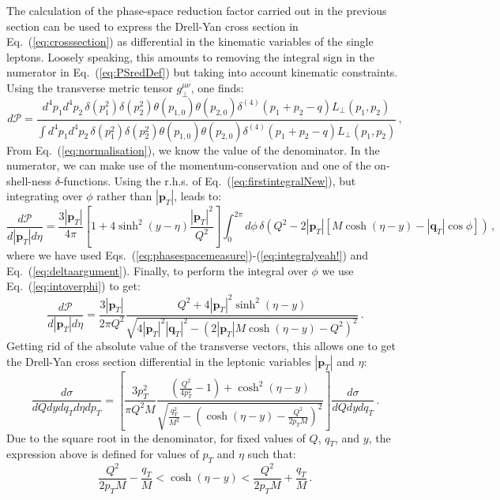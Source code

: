 \documentclass[10pt,a4paper]{article}
\begin{document}
The calculation of the phase-space reduction factor carried out in the
previous section can be used to express the Drell-Yan cross section in
Eq.~(\ref{eq:crosssection}) as differential in the kinematic variables
of the single leptons. Loosely speaking, this amounts to removing the
integral sign in the numerator in Eq.~(\ref{eq:PSredDef}) but taking
into account kinematic constraints. Using the transverse metric tensor
$g_\perp^{\mu\nu}$, one finds:
\begin{equation}
d\mathcal{P} = \frac{\displaystyle d^4p_1 d^4p_2 \,\delta(p_1^2) \delta(p_2^2)\theta(p_{1,0}) \theta(p_{2,0})\delta^{(4)}(p_1+p_2-q) L_\perp(p_1,p_2)}{\displaystyle \int d^4p_1 d^4p_2\, \delta(p_1^2) \delta(p_2^2) \theta(p_{1,0}) \theta(p_{2,0})\delta^{(4)}(p_1+p_2-q) L_\perp(p_1,p_2)}\,,
\end{equation}
From Eq.~(\ref{eq:normalisation}), we know the value of the
denominator. In the numerator, we can make use of the
momentum-conservation and one of the on-shell-ness
$\delta$-functions. Using the r.h.s. of
Eq.~(\ref{eq:firstintegralNew}), but integrating over $\phi$ rather
than $|\mathbf{p}_T|$, leads to:
\begin{equation}
\frac{d\mathcal{P}}{d|\mathbf{p}_T|d\eta} = \frac {3 |\mathbf{p}_T|}{4\pi}\left[1+4 \sinh^2(y-\eta)\frac{|\mathbf{p}_T|^2}{Q^2}\right]
 \int_0^{2\pi} d\phi\,\delta(Q^2-2 |\mathbf{p}_T|\left[M\cosh\left(\eta - y\right)-|\mathbf{q}_T|\cos\phi\right])\,,
\end{equation}
where we have used
Eqs.~(\ref{eq:phasespacemeasure})-(\ref{eq:integralyeah!}) and
Eq.~(\ref{eq:deltaargument}). Finally, to perform the integral over
$\phi$ we use Eq.~(\ref{eq:intoverphi}) to get:
\begin{equation}\label{eq:difflepphasespace}
\frac{d\mathcal{P}}{d|\mathbf{p}_T|d\eta} = \frac {3|\mathbf{p}_T|}{2\pi Q^2}
 \frac{Q^2+4 |\mathbf{p}_T|^2 \sinh^2(\eta-y)}{\sqrt{4|\mathbf{p}_T|^2|\mathbf{q}_T|^2-(2|\mathbf{p}_T|M\cosh(\eta-y)-Q^2)^2}}\,.
\end{equation}
Getting rid of the absolute value of the transverse vectors, this
allows one to get the Drell-Yan cross section differential in the
leptonic variables $|\mathbf{p}_T|$ and $\eta$:
\begin{equation}
\frac{d\sigma}{dQ dy dq_T d\eta dp_T} =
                                                          \left[\frac
                                                          {3p_T^2}{\pi
                                                          Q^2 M}\frac{\left(\frac{Q^2}{4 p_T^2}-1\right)+\cosh^2(\eta-y)}{\sqrt{\frac{q_T^2}{M^2}-\left(\cosh(\eta-y)-\frac{Q^2}{2p_TM}\right)^2}}\right]\frac{d\sigma}{dQ dy dq_T}\,.
\end{equation}
Due to the square root in the denominator, for fixed values of $Q$,
$q_T$, and $y$, the expression above is defined for values of $p_T$
and $\eta$ such that:
\begin{equation}\label{eq:kinconstr}
\frac{Q^2}{2p_TM}-\frac{q_T }{M}< \cosh(\eta-y) < \frac{Q^2}{2p_TM}+\frac{q_T}{M}\,.
\end{equation}
\end{document}
